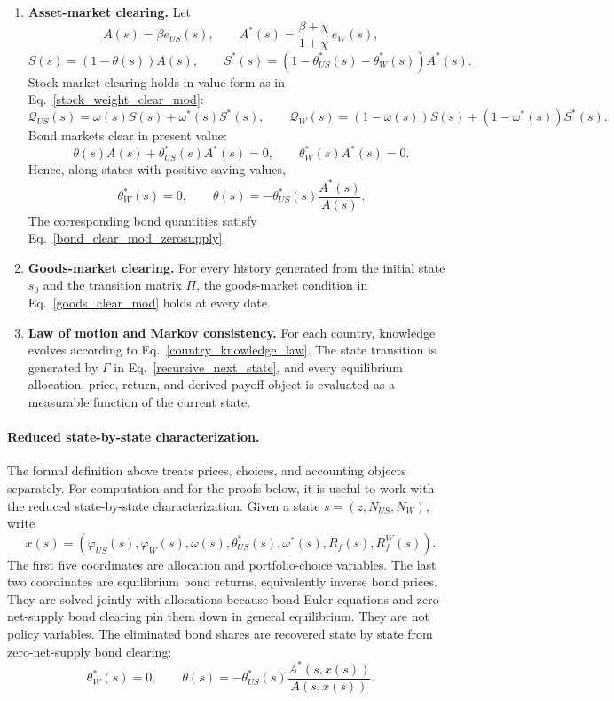 \documentclass{article}
\begin{document}
\begin{defi}
\begin{enumerate}
    \item \textbf{Asset-market clearing.} Let
    \[
    A(s)=\beta e_{US}(s),
    \qquad
    A^*(s)=\frac{\beta+\chi}{1+\chi}\,e_W(s),
    \]
    \[
    S(s)=(1-\theta(s))A(s),
    \qquad
    S^*(s)=(1-\theta_{US}^*(s)-\theta_W^*(s))A^*(s).
    \]
    Stock-market clearing holds in value form as in Eq.~\eqref{stock_weight_clear_mod}:
    \[
    \mathcal Q_{US}(s)=\omega(s)S(s)+\omega^*(s)S^*(s),
    \qquad
    \mathcal Q_W(s)=(1-\omega(s))S(s)+(1-\omega^*(s))S^*(s).
    \]
    Bond markets clear in present value:
    \[
    \theta(s)A(s)+\theta_{US}^*(s)A^*(s)=0,
    \qquad
    \theta_W^*(s)A^*(s)=0.
    \]
    Hence, along states with positive saving values,
    \[
    \theta_W^*(s)=0,
    \qquad
    \theta(s)=-\theta_{US}^*(s)\frac{A^*(s)}{A(s)}.
    \]
    The corresponding bond quantities satisfy Eq.~\eqref{bond_clear_mod_zerosupply}.

    \item \textbf{Goods-market clearing.} For every history generated from the initial state $s_0$ and the transition matrix $\Pi$, the goods-market condition in Eq.~\eqref{goods_clear_mod} holds at every date.

    \item \textbf{Law of motion and Markov consistency.} For each country, knowledge evolves according to Eq.~\eqref{country_knowledge_law}. The state transition is generated by $\Gamma$ in Eq.~\eqref{recursive_next_state}, and every equilibrium allocation, price, return, and derived payoff object is evaluated as a measurable function of the current state.
\end{enumerate}
\end{defi}

\paragraph{Reduced state-by-state characterization.}
The formal definition above treats prices, choices, and accounting objects separately. For computation and for the proofs below, it is useful to work with the reduced state-by-state characterization. Given a state $s=(z,N_{US},N_W)$, write
\[
x(s)=(\varphi_{US}(s),\varphi_W(s),\omega(s),\theta_{US}^*(s),\omega^*(s),R_f(s),R_f^W(s)).
\]
The first five coordinates are allocation and portfolio-choice variables. The last two coordinates are equilibrium bond returns, equivalently inverse bond prices. They are solved jointly with allocations because bond Euler equations and zero-net-supply bond clearing pin them down in general equilibrium. They are not policy variables. The eliminated bond shares are recovered state by state from zero-net-supply bond clearing:
\[
\theta_W^*(s)=0,
\qquad
\theta(s)=-\theta_{US}^*(s)\frac{A^*(s,x(s))}{A(s,x(s))}.
\]
\end{document}

